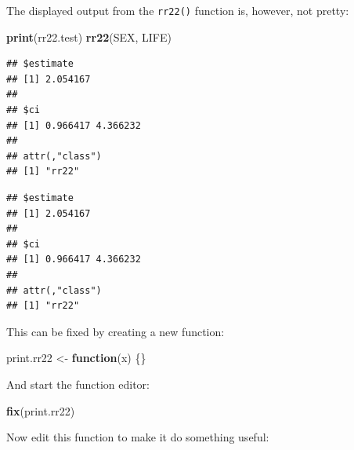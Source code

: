 \documentclass[12pt,]{book}
\newenvironment{Shaded}{\begin{snugshade}}{\end{snugshade}}
\newcommand{\KeywordTok}[1]{\textcolor[rgb]{0.13,0.29,0.53}{\textbf{#1}}}
\newcommand{\DataTypeTok}[1]{\textcolor[rgb]{0.13,0.29,0.53}{#1}}
\newcommand{\DecValTok}[1]{\textcolor[rgb]{0.00,0.00,0.81}{#1}}
\newcommand{\CharTok}[1]{\textcolor[rgb]{0.31,0.60,0.02}{#1}}
\newcommand{\StringTok}[1]{\textcolor[rgb]{0.31,0.60,0.02}{#1}}
\newcommand{\ControlFlowTok}[1]{\textcolor[rgb]{0.13,0.29,0.53}{\textbf{#1}}}
\newcommand{\OperatorTok}[1]{\textcolor[rgb]{0.81,0.36,0.00}{\textbf{#1}}}
\newcommand{\NormalTok}[1]{#1}
\theoremstyle{definition}
\theoremstyle{definition}
\theoremstyle{definition}
\theoremstyle{remark}
\begin{document}
The displayed output from the \texttt{rr22()} function is, however, not
pretty:

\begin{Shaded}
\begin{Highlighting}[]
\KeywordTok{print}\NormalTok{(rr22.test)}
\KeywordTok{rr22}\NormalTok{(SEX, LIFE)}
\end{Highlighting}
\end{Shaded}

\begin{verbatim}
## $estimate
## [1] 2.054167
## 
## $ci
## [1] 0.966417 4.366232
## 
## attr(,"class")
## [1] "rr22"
\end{verbatim}

\begin{verbatim}
## $estimate
## [1] 2.054167
## 
## $ci
## [1] 0.966417 4.366232
## 
## attr(,"class")
## [1] "rr22"
\end{verbatim}

This can be fixed by creating a new function:

\begin{Shaded}
\begin{Highlighting}[]
\NormalTok{print.rr22 <-}\StringTok{ }\ControlFlowTok{function}\NormalTok{(x) \{\}}
\end{Highlighting}
\end{Shaded}

And start the function editor:

\begin{Shaded}
\begin{Highlighting}[]
\KeywordTok{fix}\NormalTok{(print.rr22)}
\end{Highlighting}
\end{Shaded}

Now edit this function to make it do something useful:

\begin{Shaded}
\end{Shaded}
\end{document}
